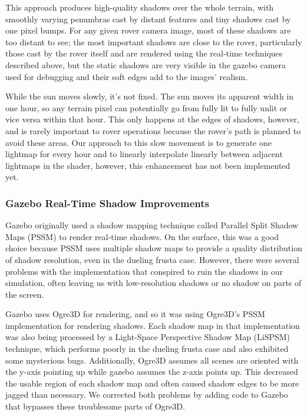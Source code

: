 \documentclass[twocolumn,letterpaper]{IEEEAerospaceCLS}  %
\begin{document}
This approach produces high-quality shadows over the whole terrain, with smoothly varying penumbras cast by distant features and tiny shadows cast by one pixel bumps.  For any given rover camera image, most of these shadows are too distant to see; the most important shadows are close to the rover, particularly those cast by the rover itself and are rendered using the real-time techniques described above, but the static shadows are very visible in the gazebo camera used for debugging and their soft edges add to the images' realism.

While the sun moves slowly, it's not fixed.  The sun moves its apparent width in one hour, so any terrain pixel can potentially go from fully lit to fully unlit or vice versa within that hour.  This only happens at the edges of shadows, however, and is rarely important to rover operations because the rover's path is planned to avoid these areas.  Our approach to this slow movement is to generate one lightmap for every hour and to linearly interpolate linearly between adjacent lightmaps in the shader, however, this enhancement has not been implemented yet.

\subsubsection{Gazebo Real-Time Shadow Improvements}
Gazebo originally used a shadow mapping technique called Parallel Split Shadow Maps (PSSM) to render real-time shadows. On the surface, this was a good choice because PSSM uses multiple shadow maps to provide a quality distribution of shadow resolution, even in the dueling frusta case. However, there were several problems with the implementation that conspired to ruin the shadows in our simulation, often leaving us with low-resolution shadows or no shadow on parts of the screen.

Gazebo uses Ogre3D for rendering, and so it was using Ogre3D's PSSM implementation for rendering shadows. Each shadow map in that implementation was also being processed by a Light-Space Perspective Shadow Map (LiSPSM) technique, which performs poorly in the dueling frusta case and also exhibited some mysterious bugs. Additionally, Ogre3D assumes all scenes are oriented with the y-axis pointing up while gazebo assumes the z-axis points up. This decreased the usable region of each shadow map and often caused shadow edges to be more jagged than necessary. We corrected both problems by adding code to Gazebo that bypasses these troublesome parts of Ogre3D.
\end{document}
